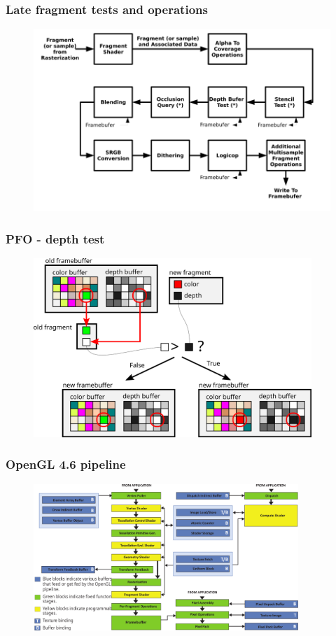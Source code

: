 \begin{frame}
\frametitle{Late fragment tests and operations}
	\begin{figure}[h]
	\includegraphics[width=12.5cm,keepaspectratio]{pics/pipeline/OpenGL460PipelineFragmentShader}
	\end{figure}
\end{frame}

\begin{frame}
\frametitle{PFO - depth test}
	\begin{figure}[h]
	\includegraphics[width=10.5cm,keepaspectratio]{pics/pipeline/PFO}
	\end{figure}
\end{frame}


\begin{frame}
\frametitle{OpenGL 4.6 pipeline}
  \begin{figure}[h]
  \includegraphics[width=10cm,keepaspectratio]{pics/pipeline/OpenGL460Pipeline}
  \end{figure}
\end{frame}


